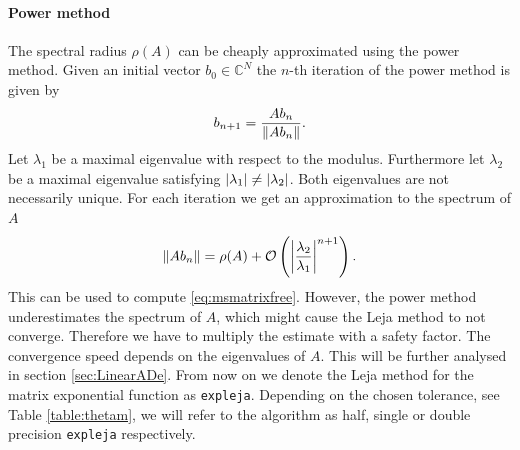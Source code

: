 \documentclass{scrartcl}
\begin{document}
	\paragraph{Power method}
	The spectral radius $\rho(A)$ can be cheaply approximated using the power method. 
	Given an initial vector $b_0\in\mathbb{C}^N$ the $n$-th iteration of the power method is given by
	\[
		b_{n+1} = \frac{Ab_n}{\lVert Ab_n\rVert}.
	\]
	Let $\lambda_{1}$ be a maximal eigenvalue with respect to the modulus. Furthermore let $\lambda_2$ be a maximal eigenvalue satisfying $\lvert\lambda_{1}\rvert\neq\lvert\lambda_2\rvert$. 
	Both eigenvalues are not necessarily unique.
	For each iteration we get an approximation to the spectrum of $A$
	\[ 
	\lVert Ab_{n}\rVert = \rho(A) + \mathcal{O}\left(\left\lvert\frac{\lambda_2}{\lambda_1}\right\rvert^{n+1}\right).
	\]  
	This can be used to compute \eqref{eq:msmatrixfree}. However, the power method underestimates the spectrum of $A$, which might cause the Leja method to not converge. Therefore we have to multiply the estimate with a safety factor. The convergence speed depends on the eigenvalues of $A$. This will be further analysed in section \ref{sec:LinearADe}.
	From now on we denote the Leja method for the matrix exponential function as \texttt{expleja}. Depending on the chosen tolerance, see Table \ref{table:thetam}, we will refer to the algorithm as half, single or double precision \texttt{expleja} respectively.
	
\end{document}
